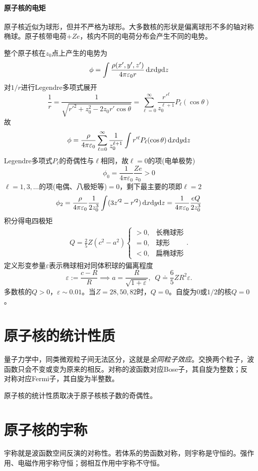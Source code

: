 \paragraph{原子核的电矩}原子核近似为球形，但并不严格为球形。大多数核的形状是偏离球形不多的轴对称椭球。原子核带电荷$+Ze$，核内不同的电荷分布会产生不同的电势。

整个原子核在$z_0$点上产生的电势为
\[
	\phi=\int\frac{\rho(x',y',z')}{4\pi\varepsilon_0r}\mathop{}\!\mathrm{d} x\mathrm{d} y\mathrm{d} z
\]
对$1/r$进行Legendre多项式展开
\[
	\frac1r=\frac1{\sqrt{r'^2+z_0^2-2z_0r'\cos\theta}}=\sum_{\ell=0}^\infty \frac{r'^\ell}{z_0^{\ell+1}}P_\ell(\cos\theta)
\]
故
\[
	\phi=\frac\rho{4\pi\varepsilon_0}\sum_{\ell=0}^\infty\frac1{z_0^{\ell+1}}\int r'^\ell P_\ell(\cos\theta)\mathop{}\!\mathrm{d} x\mathrm{d} y\mathrm{d} z
\]
Legendre多项式$P_\ell$的奇偶性与$\ell$相同，故$\ell=0$的项(电单极势)
\[
	\phi_0=\frac1{4\pi\varepsilon_0}\frac{Ze}{z_0}>0
\]
$\ell=1,3,\ldots$的项(电偶、八极矩等)$=0$，剩下最主要的项即$\ell=2$
\[
	\phi_2=\frac\rho{4\pi\varepsilon_0}\frac1{2z_0^3}\int(3z'^2-r'^2)\mathop{}\!\mathrm{d} x\mathrm{d} y\mathrm{d} z=\frac1{4\pi\varepsilon_0}\frac{eQ}{2z_0^3}
\]
积分得电四极矩
\begin{align}
	Q=\frac25Z(c^2-a^2)\begin{cases}
		>0,&\text{长椭球形}\\
		=0,&\text{球形}\\
		<0,&\text{扁椭球形}
	\end{cases}.
\end{align}
定义形变参量$\varepsilon$表示椭球相对同体积球的偏离程度
\[
	\varepsilon:=\frac{c-R}R\implies a=\frac{R}{\sqrt{1+\varepsilon}},\enspace Q\doteq\frac65ZR^2\varepsilon.
\]
多数核的$Q>0$，$\varepsilon\sim 0.01$。当$Z=28,50,82$时，$Q=0$。自旋为0或$1/2$的核$Q=0$。

\section{原子核的统计性质}

量子力学中，同类微观粒子间无法区分，这就是\textit{全同粒子效应}。交换两个粒子，波函数只会不变或变为原来的相反。对称的波函数对应Bose子，其自旋为整数；反对称对应Fermi子，其自旋为半整数。

原子核的统计性质取决于原子核核子数的奇偶性。

\section{原子核的宇称}

宇称就是波函数空间反演的对称性。若体系的势函数对称，则宇称是守恒的。强作用、电磁作用宇称守恒；弱相互作用中宇称不守恒。

